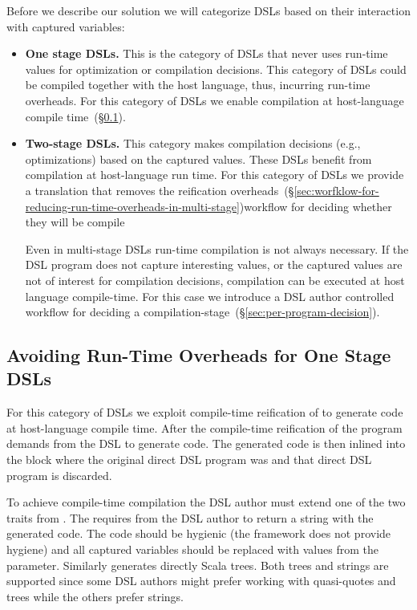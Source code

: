 Before we describe our solution we will categorize DSLs based on their interaction with captured variables:\begin{itemize}
 \item {\bf One stage DSLs.} This is the category of DSLs that never uses run-time values for optimization or compilation
  decisions. This category of DSLs could be compiled together with the host language, thus, incurring run-time overheads. For
  this category of DSLs we enable compilation at host-language compile time~(\S \ref{sec:avoiding-run-time-overheads-one-stage}).

 \item {\bf Two-stage DSLs.} This category makes compilation decisions (e.g., optimizations) based on the captured values. These
  DSLs benefit from compilation at host-language run time. For this category of DSLs we provide a
  translation that removes the reification overheads~(\S \ref{sec:worfklow-for-reducing-run-time-overheads-in-multi-stage})workflow for deciding whether they will be compile

  Even in multi-stage DSLs run-time compilation is not always necessary. If the DSL program does not capture
  interesting values, or the captured values are not of interest for compilation decisions, compilation can
  be executed at host language compile-time. For this case we introduce a DSL author controlled
  workflow for deciding a compilation-stage~(\S \ref{sec:per-program-decision}).
\end{itemize}

\subsection{Avoiding Run-Time Overheads for One Stage DSLs}
\label{sec:avoiding-run-time-overheads-one-stage}

For this category of DSLs we exploit compile-time reification of \yy to generate
 code at host-language compile time. After the compile-time reification of the program
 \yy demands from the DSL to generate code. The generated code is then inlined into
 the block where the original direct DSL program was and that direct DSL program
 is discarded.

To achieve compile-time compilation the DSL author must extend one of the two traits
 from . The  requires from the DSL author
 to return a string with the generated code. The code should be hygienic
 (the framework does not provide hygiene) and all captured variables should be replaced with
 values from the  parameter. Similarly  generates directly
 Scala trees. Both trees and strings are supported since some DSL authors might prefer
 working with quasi-quotes and trees while the others prefer strings.


